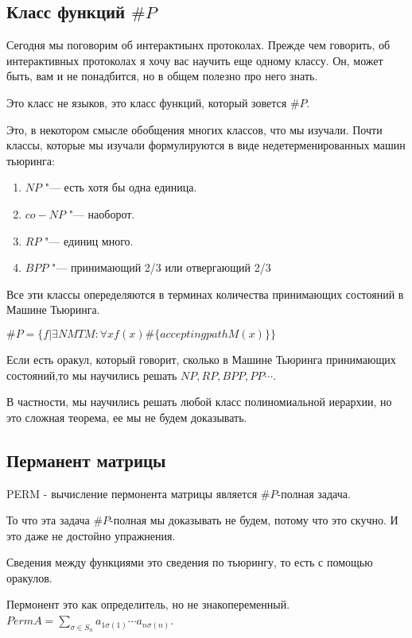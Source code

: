 ﻿\subsection{Класс функций $\#P$}
Сегодня мы поговорим об интерактиынх протоколах. Прежде чем говорить, об интерактивных протоколах я хочу вас научить еще одному классу. 
Он, может быть, вам и не понадбится, но в общем полезно про него знать.  

Это класс не языков, это класс функций, который зовется $\#P$.

Это, в некотором смысле обобщения многих классов, что мы изучали. Почти классы, 
которые мы изучали формулируются в виде недетерменированных машин тьюринга: 

\begin{enumerate}
	\item $NP$ "--- есть хотя бы одна единица. 
	\item $co-NP$ "--- наоборот.
	\item $RP$ "--- единиц много. 
	\item $BPP$ "--- принимающий 2/3 или отвергающий 2/3
\end{enumerate}

Все эти классы опеределяются в терминах количества принимающих состояний в Машине Тьюринга. 

\begin{Def}
	$\#P = \{f | \exists NMT M \colon \forall x f(x) \#\{accepting path M(x)\}\}$\\
\end{Def}

Если есть оракул, который говорит, сколько в Машине Тьюринга принимающих состояний,то
мы научились решать $NP, RP, BPP, PP\cdots$.

В частности, мы научились решать любой класс полиномиальной иерархии, но это сложная теорема, ее мы не будем доказывать. 

\subsection{Перманент матрицы}
PERM - вычисление пермонента матрицы является $\#P$-полная задача.

То что эта задача $\#P$-полная мы доказывать не будем, потому что это скучно. 
И это даже не достойно упражнения.

Сведения между функциями это сведения по тьюрингу, то есть с помощью оракулов.

\begin{Def}
	Пермонент это как определитель, но не знакопеременный.
	$Perm A = \sum_{\sigma \in S_n}a_{1\sigma(1)} \cdots a_{n\sigma(n)}$. 
\end{Def}
 
